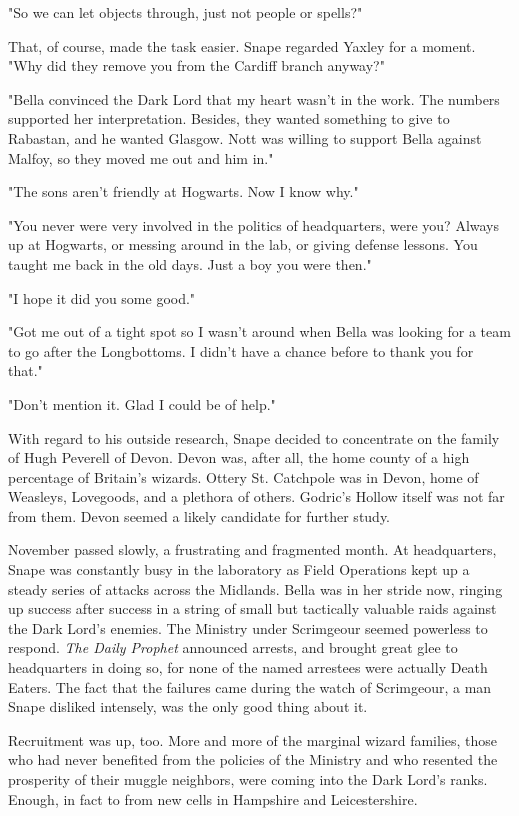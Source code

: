 \documentclass[a4paper,11pt]{article}
\begin{document}
"So we can let objects through, just not people or spells?"

That, of course, made the task easier. Snape regarded Yaxley for a moment. "Why did they remove you from the Cardiff branch anyway?"

"Bella convinced the Dark Lord that my heart wasn't in the work. The numbers supported her interpretation. Besides, they wanted something to give to Rabastan, and he wanted Glasgow. Nott was willing to support Bella against Malfoy, so they moved me out and him in."

"The sons aren't friendly at Hogwarts. Now I know why."

"You never were very involved in the politics of headquarters, were you? Always up at Hogwarts, or messing around in the lab, or giving defense lessons. You taught me back in the old days. Just a boy you were then."

"I hope it did you some good."

"Got me out of a tight spot so I wasn't around when Bella was looking for a team to go after the Longbottoms. I didn't have a chance before to thank you for that."

"Don't mention it. Glad I could be of help."

With regard to his outside research, Snape decided to concentrate on the family of Hugh Peverell of Devon. Devon was, after all, the home county of a high percentage of Britain's wizards. Ottery St. Catchpole was in Devon, home of Weasleys, Lovegoods, and a plethora of others. Godric's Hollow itself was not far from them. Devon seemed a likely candidate for further study.

November passed slowly, a frustrating and fragmented month. At headquarters, Snape was constantly busy in the laboratory as Field Operations kept up a steady series of attacks across the Midlands. Bella was in her stride now, ringing up success after success in a string of small but tactically valuable raids against the Dark Lord's enemies. The Ministry under Scrimgeour seemed powerless to respond. \emph{The Daily Prophet} announced arrests, and brought great glee to headquarters in doing so, for none of the named arrestees were actually Death Eaters. The fact that the failures came during the watch of Scrimgeour, a man Snape disliked intensely, was the only good thing about it.

Recruitment was up, too. More and more of the marginal wizard families, those who had never benefited from the policies of the Ministry and who resented the prosperity of their muggle neighbors, were coming into the Dark Lord's ranks. Enough, in fact to from new cells in Hampshire and Leicestershire.
\end{document}
